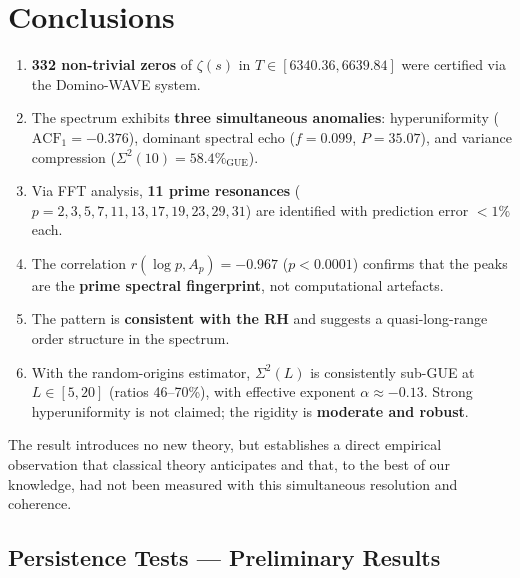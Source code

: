 \documentclass[12pt, a4paper]{article}
\begin{document}
\section{Conclusions}

\begin{enumerate}
  \item \textbf{332 non-trivial zeros} of $\zeta(s)$ in
        $T \in [6340.36, 6639.84]$ were certified via the Domino-WAVE system.

  \item The spectrum exhibits \textbf{three simultaneous anomalies}:
        hyperuniformity ($\mathrm{ACF}_1 = -0.376$), dominant spectral echo
        ($f=0.099$, $P=35.07$), and variance compression ($\Sigma^2(10)
        = 58.4\%_{\mathrm{GUE}}$).

  \item Via FFT analysis, \textbf{11 prime resonances}
        ($p = 2, 3, 5, 7, 11, 13, 17, 19, 23, 29, 31$) are identified
        with prediction error $< 1\%$ each.

  \item The correlation $r(\log p, A_p) = -0.967$ ($p < 0.0001$)
        confirms that the peaks are the \textbf{prime spectral fingerprint},
        not computational artefacts.

  \item The pattern is \textbf{consistent with the RH} and suggests a
        quasi-long-range order structure in the spectrum.

  \item With the random-origins estimator, $\Sigma^2(L)$ is consistently
        sub-GUE at $L\in[5,20]$ (ratios 46--70\%), with effective exponent
        $\alpha \approx -0.13$. Strong hyperuniformity is not claimed;
        the rigidity is \textbf{moderate and robust}.
\end{enumerate}

\medskip
\noindent
The result introduces no new theory, but establishes a direct empirical
observation that classical theory anticipates and that, to the best of our
knowledge, had not been measured with this simultaneous resolution and
coherence.

\subsection{Persistence Tests — Preliminary Results}
\label{sec:persistence}
\end{document}

